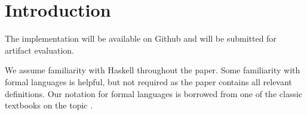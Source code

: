 \section{Introduction}

\TODO{}

The implementation will be available on Github and will be submitted for artifact evaluation. 


We assume familiarity with Haskell throughout the paper.  Some
familiarity with formal languages is helpful, but not required as the
paper contains all relevant definitions. Our notation for formal
languages is borrowed from one of the classic textbooks on the topic
\cite{AhoHopcroftUllman}.

